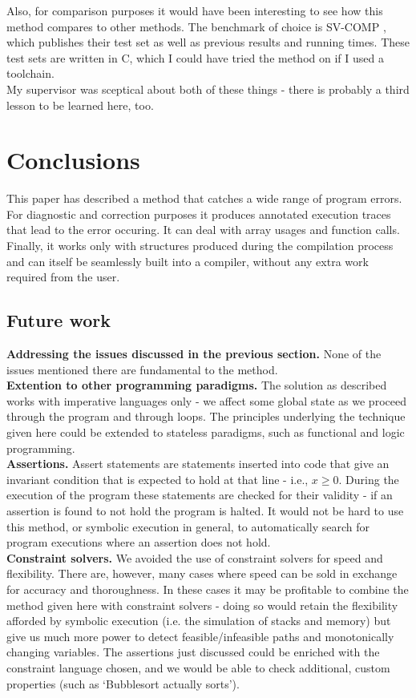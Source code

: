 \documentclass[12pt,a4paper]{article}
\begin{document}
Also, for comparison purposes it would have been interesting to see how this method
compares to other methods. The benchmark of choice is SV-COMP \citep{svcomp}, which publishes their test set as well as previous results and running times. These
test sets are written in C, which I could have tried the method on if I used a toolchain.\\

My supervisor was sceptical about both of these things - there is probably a third lesson to be learned here, too.

\section{Conclusions}
This paper has described a method that catches a wide range of program errors. For diagnostic and correction purposes it produces annotated execution traces that lead
to the error occuring. It can deal with array usages and function calls. Finally, it works only with structures produced during the compilation process
and can itself be seamlessly built into a compiler, without any extra work required from the user. 

\subsection{Future work}
\textbf{Addressing the issues discussed in the previous section.} None of the issues mentioned there are fundamental to the method.\\

\textbf{Extention to other programming paradigms.} The solution as described works with imperative languages only - we affect some global state as we proceed through
the program and through loops. The principles underlying the technique given here could be extended to stateless paradigms, such as functional and logic programming.\\

\textbf{Assertions.} Assert statements are statements inserted into code that give an invariant condition that is expected to hold at that line - i.e., $x \geq 0$.
During the execution of the program these statements are checked for their validity - if an assertion is found to not hold the program is halted. It would not be hard
to use this method, or symbolic execution in general, to automatically search for program executions where an assertion does not hold.\\

\textbf{Constraint solvers.} We avoided the use of constraint solvers for speed and flexibility. There are, however, many cases where speed can be sold in
exchange for accuracy and thoroughness. In these cases it may be profitable to combine the method given here with constraint solvers - doing so would retain the flexibility
afforded by symbolic execution (i.e. the simulation of stacks and memory) but give us much more power to detect feasible/infeasible paths and monotonically changing variables. The assertions just discussed could be enriched with the constraint language chosen, and we would be able to check additional, custom properties (such as
`Bubblesort actually sorts').\\
\end{document}

